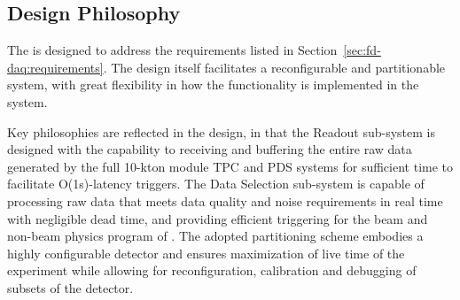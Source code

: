 \begin{dunetable}
\end{dunetable}

\subsection{Design Philosophy}

The    is designed to address the requirements listed in
Section~\ref{sec:fd-daq:requirements}. The design itself facilitates a
reconfigurable and partitionable  system, with great flexibility in how
the  functionality is implemented in the system. 

Key philosophies are reflected in the design, in that the Readout sub-system is
designed with the capability to receiving and buffering the entire raw data generated by
the full 10-kton module TPC and PDS systems for sufficient time to
facilitate O(1s)-latency triggers. The Data Selection sub-system
is capable of processing raw data that meets data quality and noise
requirements in real time with negligible dead time, and providing
efficient triggering for the beam and non-beam physics program of
. The adopted  partitioning scheme embodies a
highly configurable detector and ensures 
maximization of live time of the experiment while allowing for
reconfiguration, calibration and debugging of subsets of the detector. 

